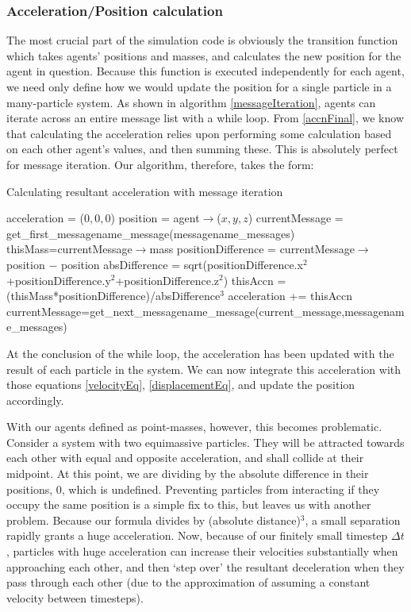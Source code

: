 \documentclass[11pt,a4paper]{article}
\begin{document}
\subsubsection{Acceleration/Position calculation}
The most crucial part of the simulation code is obviously the transition function which takes agents' positions and masses, and calculates the new position for the agent in question. Because this function is executed independently for each agent, we need only define how we would update the position for a single particle in a many-particle system. As shown in algorithm \ref{messageIteration}, agents can iterate across an entire message list with a while loop. From \ref{accnFinal}, we know that calculating the acceleration relies upon performing some calculation based on each other agent's values, and then summing these. This is absolutely perfect for message iteration. Our algorithm, therefore, takes the form:

\begin{algorithm}[H]
\caption{Calculating resultant acceleration with message iteration}
\begin{algorithmic}
\STATE acceleration = ($0,0,0$)
\STATE position = agent$\to$($x,y,z$)
\STATE currentMessage = get\_first\_messagename\_message(messagename\_messages)
  \STATE thisMass=currentMessage$\to$mass
  \STATE positionDifference = currentMessage$\to$position $-$ position
  \STATE absDifference = sqrt(positionDifference.x$^2$+positionDifference.y$^2$+positionDifference.z$^2$)
  \STATE thisAccn = (thisMass*positionDifference)/absDifference$^3$
  \STATE acceleration += thisAccn
  \STATE currentMessage=get\_next\_messagename\_message(current\_message,messagename\_messages)
\ENDWHILE
\end{algorithmic}
\end{algorithm}

\noindent At the conclusion of the while loop, the acceleration has been updated with the result of each particle in the system. We can now integrate this acceleration with those equations \ref{velocityEq}, \ref{displacementEq}, and update the position accordingly.

With our agents defined as point-masses, however, this becomes problematic. Consider a system with two equimassive particles. They will be attracted towards each other with equal and opposite acceleration, and shall collide at their midpoint. At this point, we are dividing by the absolute difference in their positions, $0$, which is undefined. Preventing particles from interacting if they occupy the same position is a simple fix to this, but leaves us with another problem. Because our formula divides by (absolute distance)$^3$, a small separation rapidly grants a huge acceleration. Now, because of our finitely small timestep $\Delta t$, particles with huge acceleration can increase their velocities substantially when approaching each other, and then `step over' the resultant deceleration when they pass through each other (due to the approximation of assuming a constant velocity between timesteps).
\end{document}

